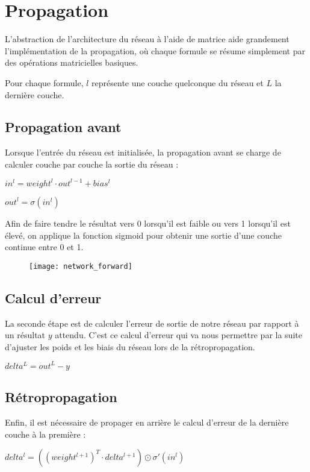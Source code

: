 \newpage

\section{Propagation}

L'abstraction de l'architecture du réseau à l'aide de matrice aide grandement
l'implémentation de la propagation, où chaque formule se résume simplement par
des opérations matricielles basiques.

Pour chaque formule, $l$ représente une couche quelconque du réseau et $L$ la
dernière couche.

\subsection{Propagation avant}

Lorsque l'entrée du réseau est initialisée, la propagation avant se charge de
calculer couche par couche la sortie du réseau :

$in^l = weight^l \cdot out^{l-1} + bias^l$

$out^l = \sigma (in^l)$

Afin de faire tendre le résultat vers 0 lorsqu'il est faible ou vers 1 lorsqu'il
est élevé, on applique la fonction sigmoid pour obtenir une sortie d'une couche
continue entre 0 et 1.

\begin{figure}[H]
    \centering
    \texttt{[image: network\_forward]}
\end{figure}

\subsection{Calcul d'erreur}

La seconde étape est de calculer l'erreur de sortie de notre réseau par rapport
à un résultat $y$ attendu. C'est ce calcul d'erreur qui va nous permettre par la
suite d'ajuster les poids et les biais du réseau lors de la rétropropagation.

$delta^L = out^L − y$

\subsection{Rétropropagation}

Enfin, il est nécessaire de propager en arrière le calcul d'erreur de la
dernière couche à la première :

$delta^l = ((weight^{l+1})^T \cdot delta^{l+1}) \odot \sigma '(in^l)$

